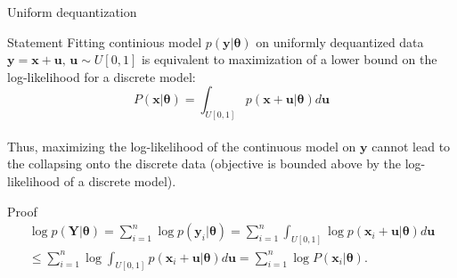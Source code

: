 \documentclass{beamer}
\newcommand{\bu}{\mathbf{u}}
\newcommand{\bx}{\mathbf{x}}
\newcommand{\by}{\mathbf{y}}
\newcommand{\bY}{\mathbf{Y}}
\newcommand{\btheta}{\boldsymbol{\theta}}
\begin{document}
\begin{frame}{Uniform dequantization}
	\begin{block}{Statement}
		Fitting continious model $p(\by | \btheta)$ on uniformly dequantized data $\by = \bx + \bu, \, \bu \sim U[0, 1]$ is equivalent to maximization of a lower bound on the log-likelihood for a discrete model:
		\[
		P(\bx | \btheta) = \int_{U[0, 1]} p(\bx + \bu | \btheta) d \bu
		\]
		\vspace{-0.2cm} \\
		Thus, maximizing the log-likelihood of the continuous model on $\by$ cannot lead to the collapsing onto the discrete data (objective is bounded above by the log-likelihood of a discrete model).
	\end{block}
	\begin{block}{Proof}
		\vspace{-1cm}
		\begin{multline*}
			\log p(\bY | \btheta) = \sum_{i = 1}^n \log p(\by_i | \btheta) = \sum_{i = 1}^n \int_{U[0, 1]} \log p(\bx_i + \bu | \btheta) d \bu \\ \leq \sum_{i = 1}^n \log \int_{U[0, 1]} p(\bx_i + \bu | \btheta) d \bu = \sum_{i=1}^n \log P(\bx_i | \btheta).
		\end{multline*}
	\end{block}
\end{frame}
\end{document}
